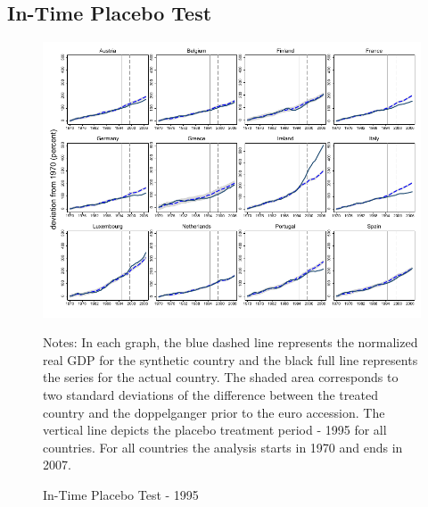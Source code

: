 \documentclass[12pt]{article}
\newcommand{\annote}[1]{\parbox{\textwidth}{\renewcommand{\baselinestretch}{1.0}\vspace{12pt} \small Notes: #1}}
\begin{document}
\begin{appendices}
\begin{landscape}
\end{landscape}

\clearpage

\subsection{In-Time Placebo Test}
\begin{figure}[h!]
    \centering
    \caption{In-Time Placebo Test - 1995 \label{F_1995}}
    \includegraphics[scale=1]{Output/Figures/SCM_gdp_Rob_1995_Annual.pdf}
    \annote{In each graph, the blue dashed line represents the normalized real GDP for the synthetic country and the black full line represents the series for the actual country. The shaded area corresponds to two standard deviations of the difference between the treated country and the doppelganger prior to the euro accession. The vertical line depicts the placebo treatment period - 1995 for all countries. For all countries the analysis starts in 1970 and ends in 2007. 
    }
\end{figure}



\end{appendices}
\end{document}
